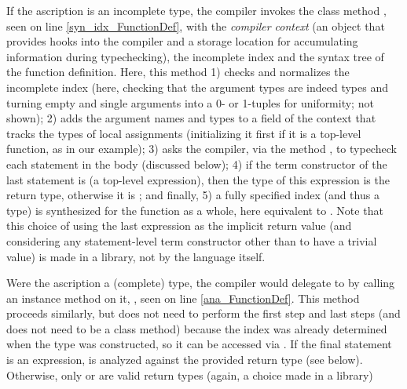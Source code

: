 If the ascription is an incomplete type, the compiler invokes the class method , seen on line \ref{syn_idx_FunctionDef}, with the \emph{compiler context} (an object that provides hooks into the compiler and a storage location for accumulating information during typechecking), the incomplete index and the syntax tree of the function definition. Here, this method 1) checks and normalizes the incomplete index (here, checking that the argument types are indeed types and turning empty and single arguments into a 0- or 1-tuples for uniformity; not shown); 2) adds the argument names and types to a field of the context that tracks the types of local assignments (initializing it first if it is a top-level function, as in our example); 3) asks the compiler, via the method , to typecheck each statement in the body (discussed below); 4) if the term constructor of the last statement is  (a top-level expression), then the type of this expression is the return type, otherwise it is ; and finally, 5) a fully specified index (and thus a type) is synthesized for the function as a whole, here equivalent to . Note that this choice of using the last expression as the implicit return value (and considering any statement-level term constructor other than  to have a trivial value) is made in a library, not by the language itself.%

Were the ascription a (complete) type, the compiler would delegate to  by calling an instance method on it, , seen on line \ref{ana_FunctionDef}. This method proceeds similarly, but does not need to perform the first step and last steps (and does not need to be a class method) because the index was already determined when the type was constructed, so it can be accessed via . If the final statement is an expression, is analyzed against the provided return type (see below). Otherwise, only  or  are valid return types (again, a choice made in a library)%

